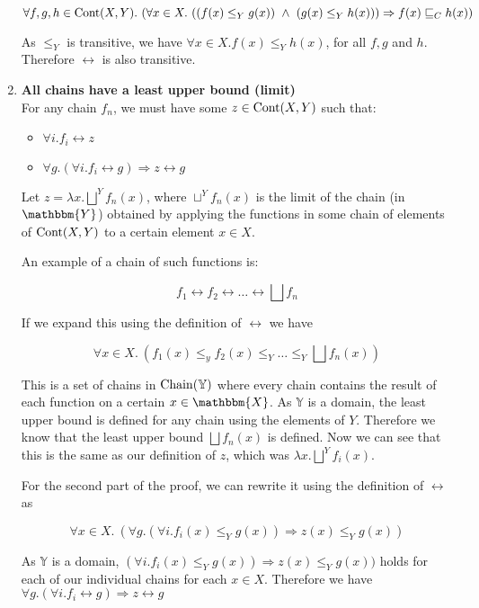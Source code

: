 \begin{enumerate}
{\begin{itemize}
{\[\forall f,g,h \in \operatorname{Cont}(X,Y). \ (\forall x \in X. \ ((f(x) \leq_Y g(x)) \ \wedge \ (g(x) \leq_Y h(x))) \Rightarrow f(x) \sqsubseteq_{C} h(x)) \]
 
As $\leq_Y$ is transitive, we have $\forall x \in X.f(x) \leq_Y h(x)$, for all $f, g$ and $h$. Therefore $\rel$ is also transitive. }
\end{itemize}}
\item{\textbf{All chains have a least upper bound (limit)}\\

For any chain $f_n$, we must have some $ z  \in \operatorname{Cont}(X,Y)$ such that:

\begin{itemize}
\item{$\forall i . f_i \rel z$}
\item{$\forall g. (\forall i . f_i \rel g) \Rightarrow z \rel g$}
\end{itemize}

Let $z = \lambda x. \bigsqcup^Y f_n (x)$, where $\sqcup^Y f_n (x)$ is the limit of the chain (in $\mathbbm{Y}$) obtained by applying the functions in some chain of elements of $\operatorname{Cont}(X,Y)$ to a certain element $x \in X$.

An example of a chain of such functions is:

\[ f_1 \rel f_2 \rel \dots \rel \bigsqcup f_n \]

If we expand this using the definition of $\rel$ we have

\[ \forall x \in X. \ (f_1(x) \leq_y f_2(x) \leq_Y \dots \leq_Y \bigsqcup f_n (x)) \]

This is a set of chains in $\operatorname{Chain}(\mathbb{Y})$ where every chain contains the result of each function on a certain $x \in \mathbbm{X}$. As $\mathbb{Y}$ is a domain, the least upper bound is defined for any chain using the elements of $Y$. Therefore we know that the least upper bound $\bigsqcup f_n (x)$ is defined. Now we can see that this is the same as our definition of $z$, which was $\lambda x. \bigsqcup^Y f_i (x)$.

For the second part of the proof, we can rewrite it using the definition of $\rel$ as

\[ \forall x \in X. \ (\forall g. (\forall i . f_i(x) \leq_Y g(x)) \Rightarrow z(x) \leq_Y g(x)) \]


As $\mathbb{Y}$ is  a domain, $(\forall i . f_i(x) \leq_Y g(x)) \Rightarrow z(x) \leq_Y g(x))$ holds for each of our individual chains for each $x \in X$. Therefore we have $ \forall g. (\forall i . f_i \rel g) \Rightarrow z \rel g$}
\end{enumerate}

